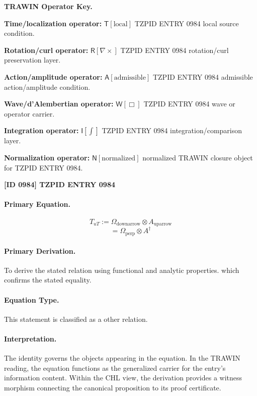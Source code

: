 \par\vspace{0.45\baselineskip}
\noindent\begin{minipage}[t]{\linewidth}
\begingroup
\small
\raggedright
\textbf{TRAWIN Operator Key.}\par
\noindent\textbf{Time/localization operator:} $\mathsf{T}\!\left[\mathrm{local}\right]$ TZPID ENTRY 0984 local source condition.\par
\noindent\textbf{Rotation/curl operator:} $\mathsf{R}\!\left[\nabla\times\right]$ TZPID ENTRY 0984 rotation/curl preservation layer.\par
\noindent\textbf{Action/amplitude operator:} $\mathsf{A}\!\left[\mathrm{admissible}\right]$ TZPID ENTRY 0984 admissible action/amplitude condition.\par
\noindent\textbf{Wave/d'Alembertian operator:} $\mathsf{W}\!\left[\Box\right]$ TZPID ENTRY 0984 wave or operator carrier.\par
\noindent\textbf{Integration operator:} $\mathsf{I}\!\left[\int\right]$ TZPID ENTRY 0984 integration/comparison layer.\par
\noindent\textbf{Normalization operator:} $\mathsf{N}\!\left[\mathrm{normalized}\right]$ normalized TRAWIN closure object for TZPID ENTRY 0984.\par
\endgroup
\end{minipage}

\clearpage
\noindent\textbf{[ID 0984] TZPID ENTRY 0984}\par
\vspace{0.35em}
\paragraph{Primary Equation.}
\[
T_{uT} := \Omega_{\mathrm{downarrow}} \otimes A_{\mathrm{uparrow}}
\]
\[
=\Omega_{\mathrm{perp}}\otimes A^{\dagger}
\]

\paragraph{Primary Derivation.}
To derive the stated relation using functional and analytic properties. which confirms the stated equality.
\paragraph{Equation Type.}
This statement is classified as a other relation.

\paragraph{Interpretation.}
The identity governs the objects appearing in the equation. In the TRAWIN reading, the equation functions as the generalized carrier for the entry’s information content. Within the CHL view, the derivation provides a witness morphism connecting the canonical proposition to its proof certificate.


